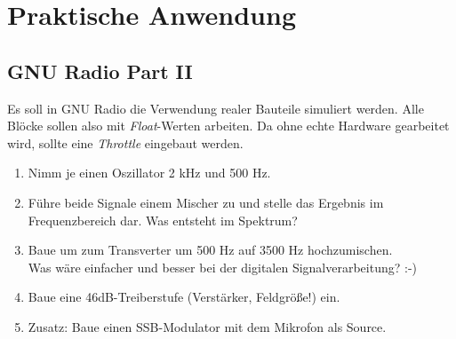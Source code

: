 \section*{Praktische Anwendung}

\subsection*{GNU Radio Part II}

Es soll in GNU Radio die Verwendung realer Bauteile simuliert werden. Alle
Blöcke sollen also mit \emph{Float}-Werten arbeiten. Da ohne echte Hardware
gearbeitet wird, sollte eine \emph{Throttle} eingebaut werden.

\begin{enumerate}
    \item Nimm je einen Oszillator 2 kHz und 500 Hz.
    \item Führe beide Signale einem Mischer zu und stelle das Ergebnis im
          Frequenzbereich dar. Was entsteht im Spektrum?
    \item Baue um zum Transverter um 500 Hz auf 3500 Hz hochzumischen. \\
          Was wäre einfacher und besser bei der digitalen Signalverarbeitung? :-)
    \item Baue eine 46dB-Treiberstufe (Verstärker, Feldgröße!) ein.
    \item Zusatz: Baue einen SSB-Modulator mit dem Mikrofon als Source.
\end{enumerate}


